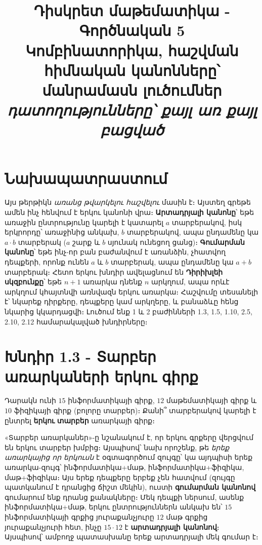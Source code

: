 \documentclass[11pt,a4paper]{article}
\title{\vspace{-1.2cm}\textbf{Դիսկրետ մաթեմատիկա - Գործնական 5}\\[2pt]
\large Կոմբինատորիկա, հաշվման հիմնական կանոնները՝ մանրամասն լուծումներ\\[2pt]
\normalsize\itshape դատողությունները՝ քայլ առ քայլ բացված}
\author{}
\date{}
\begin{document}
\maketitle
\vspace{-1.0cm}

\section*{Նախապատրաստում}
Այս թերթիկն \emph{առանց թվարկելու հաշվելու} մասին է։ Այստեղ գրեթե ամեն ինչ հենվում է երկու կանոնի վրա։
\textbf{Արտադրյալի կանոնը}՝ եթե առաջին ընտրությունը կարելի է կատարել $a$ տարբերակով, իսկ երկրորդը՝
առաջինից անկախ, $b$ տարբերակով, ապա ընդամենը կա $a\cdot b$ տարբերակ ($a$
շարք և $b$ սյունակ ունեցող ցանց)։ \textbf{Գումարման կանոնը}՝ եթե ինչ-որ բան բաժանվում է առանձին,
չհատվող դեպքերի, որոնք ունեն $a$ և $b$ տարբերակ, ապա ընդամենը կա $a+b$ տարբերակ։ Հետո երկու խնդիր
ավելացնում են \textbf{Դիրիխլեի սկզբունքը}՝ եթե $n+1$ առարկա դնենք $n$ արկղում, ապա որևէ արկղում
կհայտնվի առնվազն երկու առարկա։ Հաշվումը տեսանելի է՝ նկարեք դիրքերը, դեպքերը կամ արկղերը, և բանաձևը
հենց նկարից կկարդացվի։ Լուծում ենք 1 և 2 բաժինների 1.3, 1.5, 1.10, 2.5, 2.10, 2.12 համարակալված խնդիրները։

\section*{Խնդիր 1.3 - Տարբեր առարկաների երկու գիրք}

\begin{problembox}[1.3]
Դարակն ունի $15$ ինֆորմատիկայի գիրք, $12$ մաթեմատիկայի գիրք և $10$ ֆիզիկայի գիրք (բոլորը
տարբեր)։ Քանի՞ տարբերակով կարելի է ընտրել \textbf{երկու} \textbf{տարբեր} առարկայի գիրք։
\end{problembox}

\begin{ideabox}
«Տարբեր առարկաներ»-ը նշանակում է, որ երկու գրքերը վերցվում են երկու տարբեր խմբից։ Այսպիսով՝ նախ
որոշենք, թե \emph{երեք առարկայից որ երկուսն} է օգտագործում զույգը՝ կա այդպիսի երեք առարկա-զույգ՝
ինֆորմատիկա+մաթ, ինֆորմատիկա+ֆիզիկա, մաթ+ֆիզիկա։ Այս երեք դեպքերը երբեք չեն հատվում (զույգը
պատկանում է դրանցից ճիշտ մեկին), ուստի \textbf{գումարման կանոնով} գումարում ենք դրանց քանակները։
Մեկ դեպքի ներսում, ասենք ինֆորմատիկա+մաթ, երկու ընտրություններն անկախ են՝ $15$ ինֆորմատիկայի
գրքից յուրաքանչյուրը $12$ մաթ գրքից յուրաքանչյուրի հետ, ինչը $15\cdot 12$ է \textbf{արտադրյալի
կանոնով}։ Այսպիսով՝ ամբողջ պատասխանը երեք արտադրյալի մեկ գումար է։
\end{ideabox}
\end{document}
